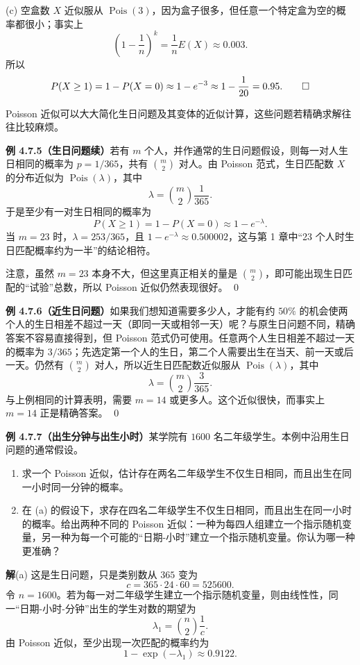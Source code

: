 \documentclass[UTF8,12pt,a4paper,fontset=fandol]{ctexart}
\begin{document}
(c) 空盒数 $X$ 近似服从 $\operatorname{Pois}(3)$，因为盒子很多，但任意一个特定盒为空的概率都很小；事实上
\[
  \left(1-\frac{1}{n}\right)^k=\frac{1}{n}E(X)\approx 0.003.
\]
所以
\[
  P(X\ge 1)=1-P(X=0)\approx 1-e^{-3}\approx 1-\frac{1}{20}=0.95. \qed
\]

Poisson 近似可以大大简化生日问题及其变体的近似计算，这些问题若精确求解往往比较麻烦。

\noindent\textbf{例 4.7.5（生日问题续）}\quad 若有 $m$ 个人，并作通常的生日问题假设，则每一对人生日相同的概率为 $p=1/365$，共有 $\binom{m}{2}$ 对人。由 Poisson 范式，生日匹配数 $X$ 的分布近似为 $\operatorname{Pois}(\lambda)$，其中
\[
  \lambda=\binom{m}{2}\frac{1}{365}.
\]
于是至少有一对生日相同的概率为
\[
  P(X\ge 1)=1-P(X=0)\approx 1-e^{-\lambda}.
\]
当 $m=23$ 时，$\lambda=253/365$，且 $1-e^{-\lambda}\approx 0.500002$，这与第 1 章中“23 个人时生日匹配概率约为一半”的结论相符。

注意，虽然 $m=23$ 本身不大，但这里真正相关的量是 $\binom{m}{2}$，即可能出现生日匹配的“试验”总数，所以 Poisson 近似仍然表现很好。 \qed

\noindent\textbf{例 4.7.6（近生日问题）}\quad 如果我们想知道需要多少人，才能有约 $50\%$ 的机会使两个人的生日相差不超过一天（即同一天或相邻一天）呢？与原生日问题不同，精确答案不容易直接得到，但 Poisson 范式仍可使用。任意两个人生日相差不超过一天的概率为 $3/365$；先选定第一个人的生日，第二个人需要出生在当天、前一天或后一天。仍然有 $\binom{m}{2}$ 对人，所以近生日匹配数近似服从 $\operatorname{Pois}(\lambda)$，其中
\[
  \lambda=\binom{m}{2}\frac{3}{365}.
\]
与上例相同的计算表明，需要 $m=14$ 或更多人。这个近似很快，而事实上 $m=14$ 正是精确答案。 \qed

\noindent\textbf{例 4.7.7（出生分钟与出生小时）}\quad 某学院有 $1600$ 名二年级学生。本例中沿用生日问题的通常假设。
\begin{enumerate}
  \item[(a)] 求一个 Poisson 近似，估计存在两名二年级学生不仅生日相同，而且出生在同一小时同一分钟的概率。
  \item[(b)] 在 (a) 的假设下，求存在四名二年级学生不仅生日相同，而且出生在同一小时的概率。给出两种不同的 Poisson 近似：一种为每四人组建立一个指示随机变量，另一种为每一个可能的“日期-小时”建立一个指示随机变量。你认为哪一种更准确？
\end{enumerate}

\noindent\textbf{解}\quad (a) 这是生日问题，只是类别数从 $365$ 变为
\[
  c=365\cdot 24\cdot 60=525600.
\]
令 $n=1600$。若为每一对二年级学生建立一个指示随机变量，则由线性性，同一“日期-小时-分钟”出生的学生对数的期望为
\[
  \lambda_1=\binom{n}{2}\frac{1}{c}.
\]
由 Poisson 近似，至少出现一次匹配的概率约为
\[
  1-\exp(-\lambda_1)\approx 0.9122.
\]
\end{document}
